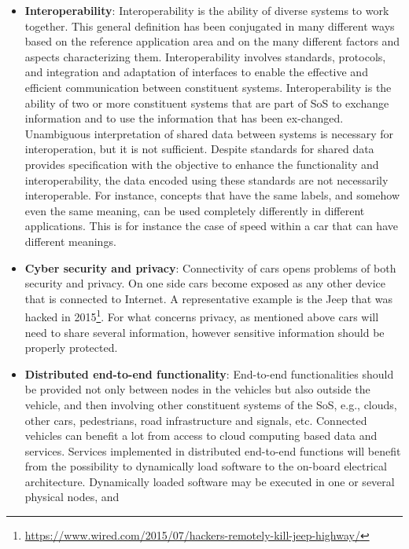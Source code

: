 \begin{itemize}
\item {\bf Interoperability}: Interoperability is the ability of diverse systems to work together. This general definition has been conjugated in many different ways based on the reference application area and on the many different factors and aspects characterizing them. Interoperability involves standards, protocols, and integration and adaptation of interfaces to enable the effective and efficient communication between constituent systems. Interoperability is the ability of two or more constituent systems that are part of SoS to exchange information and to use the information that has been ex-changed. Unambiguous interpretation of shared data between systems is necessary for interoperation, but it is not sufficient. Despite standards for shared data provides specification with the objective to enhance the functionality and interoperability, the data encoded using these standards are not necessarily interoperable. For instance, concepts that have the same labels, and somehow even the same meaning, can be used completely differently in different applications. This is for instance the case of speed within a car that can have different meanings.
\item {\bf Cyber security and privacy}:
Connectivity of cars opens problems of both security and privacy. On one side cars become exposed as any other device that is connected to Internet. A representative example is the Jeep that was hacked in 2015\footnote{\url{https://www.wired.com/2015/07/hackers-remotely-kill-jeep-highway/}}. For what concerns privacy, as mentioned above cars will need to share several information, however sensitive information should be properly protected.
\item {\bf Distributed end-to-end functionality}: End-to-end functionalities should be provided not only between nodes in the vehicles but also outside the vehicle, and then involving other constituent systems of the SoS, e.g., clouds, other cars, pedestrians, road infrastructure and signals, etc. Connected vehicles can benefit a lot from access to cloud computing based data and services. %
Services implemented in distributed end-to-end functions will benefit from the possibility to dynamically load software to the on-board electrical architecture. Dynamically loaded software may be executed in one or several physical nodes, and %

\end{itemize}

